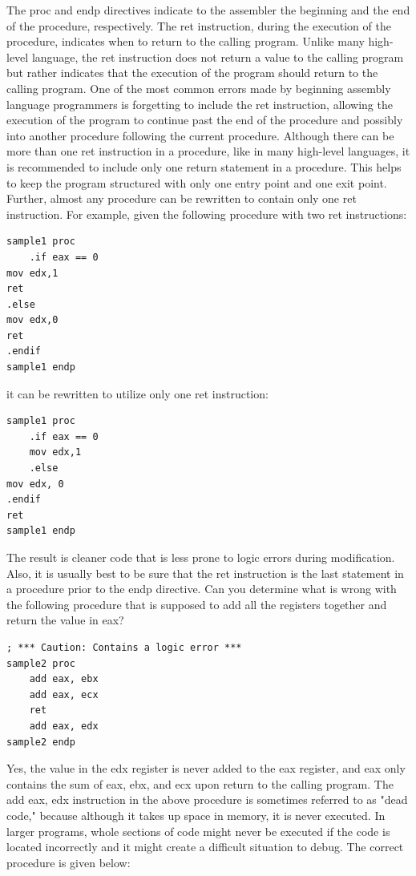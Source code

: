 \documentclass[10pt]{book}
\begin{document}
The proc and endp directives indicate to the assembler the beginning and the end of the procedure, respectively. The ret instruction, during the execution of the procedure, indicates when to return to the calling program. Unlike many high-level language, the ret instruction does not return a value to the calling program but rather indicates that the execution of the program should return to the calling program. One of the most common errors made by beginning assembly language programmers is forgetting to include the ret instruction, allowing the execution of the program to continue past the end of the procedure and possibly into another procedure following the current procedure. Although there can be more than one ret instruction in a procedure, like in many high-level languages, it is recommended to include only one return statement in a procedure. This helps to keep the program structured with only one entry point and one exit point. Further, almost any procedure can be rewritten to contain only one ret instruction. For example, given the following procedure with two ret instructions:

\begin{verbatim}
sample1 proc
    .if eax == 0
mov edx,1
ret
.else
mov edx,0
ret
.endif
sample1 endp
\end{verbatim}

it can be rewritten to utilize only one ret instruction:

\begin{verbatim}
sample1 proc
    .if eax == 0
    mov edx,1
    .else
mov edx, 0
.endif
ret
sample1 endp
\end{verbatim}

The result is cleaner code that is less prone to logic errors during modification. Also, it is usually best to be sure that the ret instruction is the last statement in a procedure prior to the endp directive. Can you determine what is wrong with the following procedure that is supposed to add all the registers together and return the value in eax?

\begin{verbatim}
; *** Caution: Contains a logic error ***
sample2 proc
    add eax, ebx
    add eax, ecx
    ret
    add eax, edx
sample2 endp
\end{verbatim}

Yes, the value in the edx register is never added to the eax register, and eax only contains the sum of eax, ebx, and ecx upon return to the calling program. The add eax, edx instruction in the above procedure is sometimes referred to as "dead code," because although it takes up space in memory, it is never executed. In larger programs, whole sections of code might never be executed if the code is located incorrectly and it might create a difficult situation to debug. The correct procedure is given below:
\end{document}
